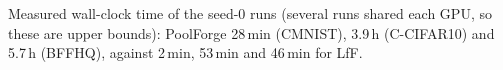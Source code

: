 Measured wall-clock time of the seed-0 runs (several runs shared each GPU, so these are upper bounds): PoolForge
28\,min (CMNIST), 3.9\,h (C-CIFAR10) and 5.7\,h (BFFHQ), against 2\,min, 53\,min and 46\,min for LfF.
